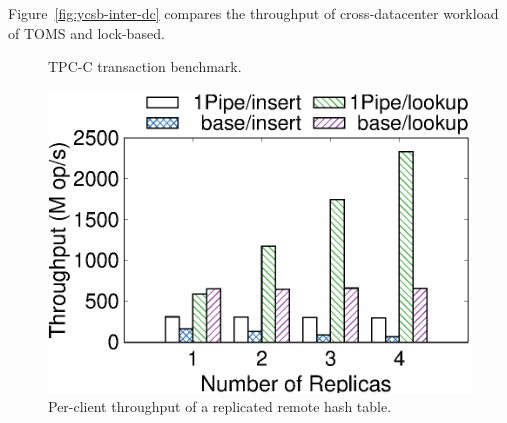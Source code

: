 Figure~\ref{fig:ycsb-inter-dc} compares the throughput of cross-datacenter workload of TOMS and lock-based.
\fi

\begin{figure}[t]
    \begin{minipage}[]{.66\textwidth}
    	\centering
    	\hspace{0.01\textwidth}
    	\caption{TPC-C transaction benchmark.}
    	\label{fig:tpc-c}
    \end{minipage}
    \hspace{0.01\textwidth}
    \begin{minipage}[]{.32\textwidth}
        \includegraphics[width=\textwidth]{gnuplot/remote-hashtable.eps}
    	\caption{Per-client throughput of a replicated remote hash table.}
    	\label{fig:remote-hashtable}
    \end{minipage}
    \vspace{-15pt}
\end{figure}


